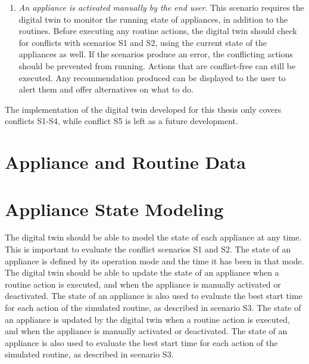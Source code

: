 \begin{enumerate}[label={\textit{S\arabic*.}}, leftmargin=3.5em]
    \item \textit{An appliance is activated manually by the end user}. This scenario requires the digital twin to monitor the running state of appliances, in addition to the routines. Before executing any routine actions, the digital twin should check for conflicts with scenarios S1 and S2, using the current state of the appliances as well. If the scenarios produce an error, the conflicting actions should be prevented from running. Actions that are conflict-free can still be executed. Any recommendation produced can be displayed to the user to alert them and offer alternatives on what to do.
\end{enumerate}

The implementation of the digital twin developed for this thesis only covers conflicts S1-S4, while conflict S5 is left as a future development.

\section{Appliance and Routine Data}





\section{Appliance State Modeling}

The digital twin should be able to model the state of each appliance at any time. This is important to evaluate the conflict scenarios S1 and S2. The state of an appliance is defined by its operation mode and the time it has been in that mode. The digital twin should be able to update the state of an appliance when a routine action is executed, and when the appliance is manually activated or deactivated. The state of an appliance is also used to evaluate the best start time for each action of the simulated routine, as described in scenario S3. The state of an appliance is updated by the digital twin when a routine action is executed, and when the appliance is manually activated or deactivated. The state of an appliance is also used to evaluate the best start time for each action of the simulated routine, as described in scenario S3.


